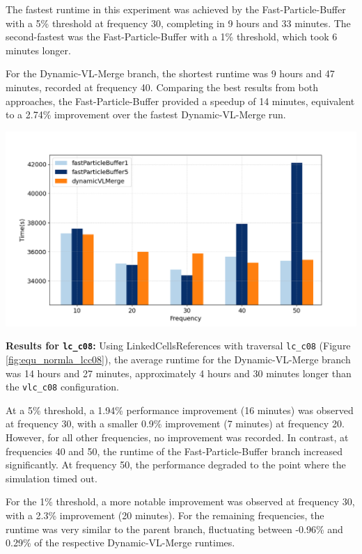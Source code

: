 The fastest runtime in this experiment was achieved by the Fast-Particle-Buffer with a 5\% threshold at frequency 30, completing in 9 hours and 33 minutes. The second-fastest was the Fast-Particle-Buffer with a 1\% threshold, which took 6 minutes longer.

For the Dynamic-VL-Merge branch, the shortest runtime was 9 hours and 47 minutes, recorded at frequency 40. Comparing the best results from both approaches, the Fast-Particle-Buffer provided a speedup of 14 minutes, equivalent to a 2.74\% improvement over the fastest Dynamic-VL-Merge run.

\begin{center}
    \includegraphics[width=0.8\linewidth]{graphs/spinodalDecomposition/vlcc08.png}
    \captionsetup{hypcap=false}
    \label{fig:equ_normla_vlcc08}
\end{center}



\textbf{Results for \texttt{lc\_c08}:}  
Using LinkedCellsReferences with traversal \texttt{lc\_c08} (Figure \ref{fig:equ_normla_lcc08}), the average runtime for the Dynamic-VL-Merge branch was 14 hours and 27 minutes, approximately 4 hours and 30 minutes longer than the \texttt{vlc\_c08} configuration.

At a 5\% threshold, a 1.94\% performance improvement (16 minutes) was observed at frequency 30, with a smaller 0.9\% improvement (7 minutes) at frequency 20. However, for all other frequencies, no improvement was recorded. In contrast, at frequencies 40 and 50, the runtime of the Fast-Particle-Buffer branch increased significantly. At frequency 50, the performance degraded to the point where the simulation timed out.


For the 1\% threshold, a more notable improvement was observed at frequency 30, with a 2.3\% improvement (20 minutes). For the remaining frequencies, the runtime was very similar to the parent branch, fluctuating between -0.96\% and 0.29\% of the respective Dynamic-VL-Merge runtimes.

